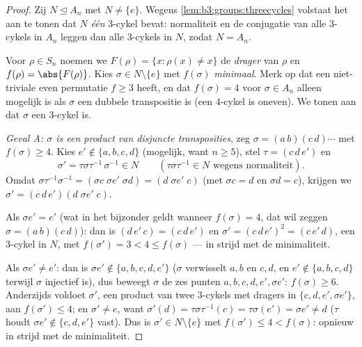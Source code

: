 \begin{proof}
Zij $N \trianglelefteq A_n$ met $N \neq \{e\}$. Wegens
\cref{lem:b3:groups:threecycles} volstaat het aan te tonen dat $N$
\emph{één} $3$-cykel bevat: normaliteit en de conjugatie van alle
$3$-cykels in $A_n$ leggen dan alle $3$-cykels in $N$, zodat $N =
A_n$.

Voor $\rho \in S_n$ noemen we $F(\rho) = \{x : \rho(x) \neq x\}$ de
\emph{drager} van $\rho$ en $f(\rho) = \abs{F(\rho)}$. Kies $\sigma
\in N \setminus \{e\}$ met $f(\sigma)$ \emph{minimaal}. Merk op dat
een niet-triviale even permutatie $f \geq 3$ heeft, en dat
$f(\sigma) = 4$ voor $\sigma \in A_n$ alleen mogelijk is als
$\sigma$ een dubbele transpositie is (een $4$-cykel is oneven). We
tonen aan dat $\sigma$ een $3$-cykel is.

\emph{Geval A: $\sigma$ is een product van disjuncte
transposities}, zeg $\sigma = (a\,b)(c\,d)\cdots$ met $f(\sigma)
\geq 4$. Kies $e' \notin \{a, b, c, d\}$ (mogelijk, want $n \geq
5$), stel $\tau = (c\,d\,e')$ en
\[
\sigma' = \tau\sigma\tau^{-1}\,\sigma^{-1} \in N
\qquad (\tau\sigma\tau^{-1} \in N \text{ wegens normaliteit}).
\]
Omdat $\sigma\tau^{-1}\sigma^{-1} = (\sigma c\;\sigma e'\;\sigma d)
= (d\;\sigma e'\;c)$ (met $\sigma c = d$ en $\sigma d = c$), krijgen
we $\sigma' = (c\,d\,e')(d\;\sigma e'\;c)$.

Als $\sigma e' = e'$ (wat in het bijzonder geldt wanneer $f(\sigma)
= 4$, dat wil zeggen $\sigma = (a\,b)(c\,d)$): dan is $(d\,e'\,c) =
(c\,d\,e')$ en $\sigma' = (c\,d\,e')^2 = (c\,e'\,d)$, een $3$-cykel
in $N$, met $f(\sigma') = 3 < 4 \leq f(\sigma)$ --- in strijd met
de minimaliteit.

Als $\sigma e' \neq e'$: dan is $\sigma e' \notin \{a, b, c, d,
e'\}$ ($\sigma$ verwisselt $a,b$ en $c,d$, en $e' \notin
\{a,b,c,d\}$ terwijl $\sigma$ injectief is), dus beweegt $\sigma$
de zes punten $a, b, c, d, e', \sigma e'$: $f(\sigma) \geq 6$.
Anderzijds voldoet $\sigma'$, een product van twee $3$-cykels met
dragers in $\{c, d, e', \sigma e'\}$, aan $f(\sigma') \leq 4$; en
$\sigma' \neq e$, want $\sigma'(d) = \tau\sigma\tau^{-1}(c) =
\tau\sigma(e') = \sigma e' \neq d$ ($\tau$ houdt $\sigma e' \notin
\{c,d,e'\}$ vast). Dus is $\sigma' \in N \setminus\{e\}$ met
$f(\sigma') \leq 4 < f(\sigma)$: opnieuw in strijd met de
minimaliteit.


\end{proof}
